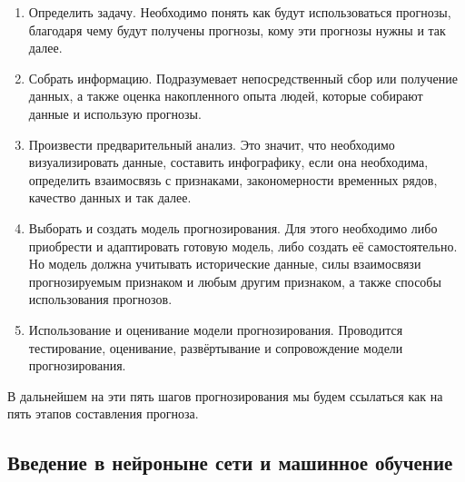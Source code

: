 {  \begin{enumerate} 
    \item Определить задачу. Необходимо понять как будут использоваться прогнозы, благодаря чему будут получены прогнозы, кому эти прогнозы нужны и так далее. 
    \item Собрать информацию. Подразумевает непосредственный сбор или получение данных, а также оценка накопленного опыта людей, которые собирают данные и использую прогнозы.
    \item Произвести предварительный анализ. Это значит, что необходимо визуализировать данные, составить инфографику, если она необходима, определить взаимосвязь с признаками, закономерности временных рядов, качество данных и так далее.
    \item Выборать и создать модель прогнозирования. Для этого необходимо либо приобрести и адаптировать готовую модель, либо создать её самостоятельно. Но модель должна учитывать исторические данные, силы взаимосвязи прогнозируемым признаком и любым другим признаком, а также способы использования прогнозов.
    \item Использование и оценивание модели прогнозирования. Проводится тестирование, оценивание, развёртывание и сопровождение модели прогнозирования. 
  \end{enumerate} 

  \par \redline В дальнейшем на эти пять шагов прогнозирования мы будем ссылаться как на пять этапов составления прогноза.

  \par
}

\titlespace
\subsection*{  
  \cyrillicfont 
  \fontsize{14pt}{0pt}\selectfont
  \englishfont
   Введение в нейроныне сети и машинное обучение
}
\titlespace

